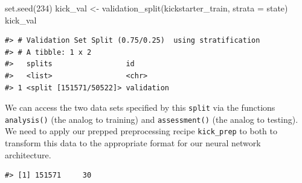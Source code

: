 \documentclass[
]{krantz}
\makeatletter
\newenvironment{Shaded}{\begin{snugshade}}{\end{snugshade}}
\newcommand{\AttributeTok}[1]{\textcolor[rgb]{0.77,0.63,0.00}{#1}}
\newcommand{\DecValTok}[1]{\textcolor[rgb]{0.00,0.00,0.81}{#1}}
\newcommand{\FunctionTok}[1]{\textcolor[rgb]{0.00,0.00,0.00}{#1}}
\newcommand{\NormalTok}[1]{#1}
\newcommand{\OtherTok}[1]{\textcolor[rgb]{0.56,0.35,0.01}{#1}}
\newcommand{\SpecialCharTok}[1]{\textcolor[rgb]{0.00,0.00,0.00}{#1}}
\newcommand{\StringTok}[1]{\textcolor[rgb]{0.31,0.60,0.02}{#1}}
\newenvironment{kframe}{%
\medskip{}
\setlength{\fboxsep}{.8em}
 \def\at@end@of@kframe{}%
 \ifinner\ifhmode%
  \def\at@end@of@kframe{\end{minipage}}%
  \begin{minipage}{\columnwidth}%
 \fi\fi%
 \def\FrameCommand##1{\hskip\@totalleftmargin \hskip-\fboxsep
 \colorbox{shadecolor}{##1}\hskip-\fboxsep
     \hskip-\linewidth \hskip-\@totalleftmargin \hskip\columnwidth}%
 \MakeFramed {\advance\hsize-\width
   \@totalleftmargin\z@ \linewidth\hsize
   \@setminipage}}%
 {\par\unskip\endMakeFramed%
 \at@end@of@kframe}
\renewenvironment{Shaded}{\begin{kframe}}{\end{kframe}}
\makeatother
\begin{document}
\begin{Shaded}
\begin{Highlighting}[]
\FunctionTok{set.seed}\NormalTok{(}\DecValTok{234}\NormalTok{)}
\NormalTok{kick\_val }\OtherTok{\textless{}{-}} \FunctionTok{validation\_split}\NormalTok{(kickstarter\_train, }\AttributeTok{strata =}\NormalTok{ state)}
\NormalTok{kick\_val}
\end{Highlighting}
\end{Shaded}

\begin{verbatim}
#> # Validation Set Split (0.75/0.25)  using stratification 
#> # A tibble: 1 x 2
#>   splits                 id        
#>   <list>                 <chr>     
#> 1 <split [151571/50522]> validation
\end{verbatim}

We can access the two data sets specified by this \texttt{split} via the functions \texttt{analysis()} (the analog to training) and \texttt{assessment()} (the analog to testing). We need to apply our prepped preprocessing recipe \texttt{kick\_prep} to both to transform this data to the appropriate format for our neural network architecture.

\begin{Shaded}
\end{Shaded}

\begin{verbatim}
#> [1] 151571     30
\end{verbatim}

\begin{Shaded}
\end{Shaded}
\end{document}
